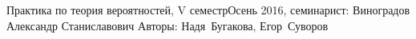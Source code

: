 


\BigHeader
    {Практика по теория вероятностей, V семестр}{Осень 2016, семинарист: Виноградов Александр Станиславович}
    {Авторы: Надя~Бугакова, Егор~Суворов}
\gdef\LectureName{Теор. вер-тей, V семестр}




